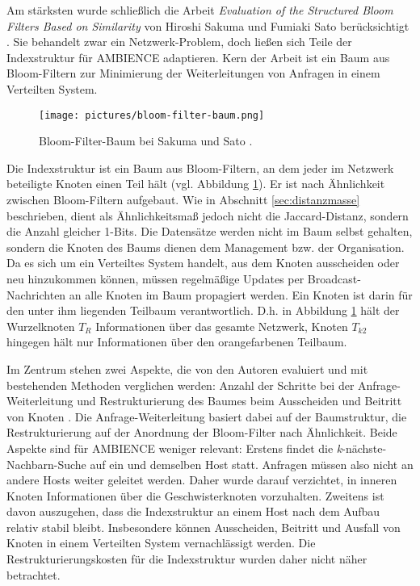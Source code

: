 Am stärksten wurde schließlich die Arbeit \textit{Evaluation of the Structured Bloom Filters Based on Similarity} von Hiroshi Sakuma und Fumiaki Sato berücksichtigt \cite{Sakuma2011}. Sie behandelt zwar ein Netzwerk-Problem, doch ließen sich Teile der Indexstruktur für AMBIENCE adaptieren. Kern der Arbeit ist ein Baum aus Bloom-Filtern zur Minimierung der Weiterleitungen von Anfragen in einem Verteilten System. 
\begin{figure}[hpbt]
  \centering
  \texttt{[image: pictures/bloom-filter-baum.png]}\\
  \caption[Bloom-Filter-Baum bei Sakuma und Sato]{Bloom-Filter-Baum bei Sakuma und Sato \cite{Sakuma2011}.}\label{fig:pic5}
\end{figure}
Die Indexstruktur ist ein Baum aus Bloom-Filtern, an dem jeder im Netzwerk beteiligte Knoten einen Teil hält (vgl. Abbildung \ref{fig:pic5}). Er ist nach Ähnlichkeit zwischen Bloom-Filtern aufgebaut. Wie in Abschnitt \ref{sec:distanzmasse} beschrieben, dient als Ähnlichkeitsmaß jedoch nicht die Jaccard-Distanz, sondern die Anzahl gleicher 1-Bits. Die Datensätze werden nicht im Baum selbst gehalten, sondern die Knoten des Baums dienen dem Management bzw. der Organisation. Da es sich um ein Verteiltes System handelt, aus dem Knoten ausscheiden oder neu hinzukommen können, müssen regelmäßige Updates per Broadcast-Nachrichten an alle Knoten im Baum propagiert werden. Ein Knoten ist darin für den unter ihm liegenden Teilbaum verantwortlich. D.h. in Abbildung \ref{fig:pic5} hält der Wurzelknoten $T_R$ Informationen über das gesamte Netzwerk, Knoten $T_{k2}$ hingegen hält nur Informationen über den orangefarbenen Teilbaum. 

Im Zentrum stehen zwei Aspekte, die von den Autoren evaluiert und mit bestehenden Methoden verglichen werden: Anzahl der Schritte bei der Anfrage-Weiterleitung und Restrukturierung des Baumes beim Ausscheiden und Beitritt von Knoten \cite{Sakuma2011}. Die Anfrage-Weiterleitung basiert dabei auf der Baumstruktur, die Restrukturierung auf der Anordnung der Bloom-Filter nach Ähnlichkeit. Beide Aspekte sind für AMBIENCE weniger relevant: Erstens findet die \textit{k}-nächste-Nachbarn-Suche auf ein und demselben Host statt. Anfragen müssen also nicht an andere Hosts weiter geleitet werden. Daher wurde darauf verzichtet, in inneren Knoten Informationen über die Geschwisterknoten vorzuhalten. Zweitens ist davon auszugehen, dass die Indexstruktur an einem Host nach dem Aufbau relativ stabil bleibt. Insbesondere können Ausscheiden, Beitritt und Ausfall von Knoten in einem Verteilten System vernachlässigt werden. Die Restrukturierungskosten für die Indexstruktur wurden daher nicht näher betrachtet.  

